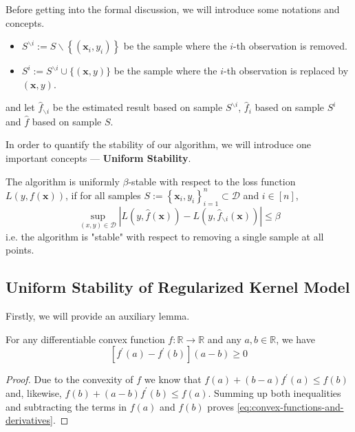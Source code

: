 \noindent Before getting into the formal discussion, we will introduce some notations and concepts.
\begin{itemize}
	\item $S^{\backslash i}:=S\backslash\left\{(\mathbf{x}_{i},y_{i})\right\}$ be the sample where the $i$-th observation is removed.
	\item $S^{i}:=S^{\backslash i}\cup\{(\mathbf{x},y)\}$ be the sample where the $i$-th observation is replaced by $(\mathbf{x},y)$.
\end{itemize}
and let $\hat{f}_{\backslash i}$ be the estimated result based on sample $S^{\backslash i}$, $\hat{f}_{i}$ based on sample $S^{i}$ and $\hat{f}$ based on sample $S$.

In order to quantify the stability of our algorithm, we will introduce one important concepts --- \textbf{Uniform Stability}.
\begin{definition}
	\label{def:uniform-stability}
	The algorithm is uniformly $\beta$-stable with respect to the loss function $L\left(y,f(\mathbf{x})\right)$, if for all samples $S:=\left\{\mathbf{x}_{i},y_{i}\right\}_{i=1}^{n}\subset\mathcal{D}$ and $i\in[n]$,
	\begin{equation}
		\sup_{(x,y)\in\mathcal{D}}\left|L\left(y,\hat{f}(\mathbf{x})\right)-L\left(y,\hat{f}_{\backslash i}(\mathbf{x})\right)\right|\leq\beta
	\end{equation}
	i.e. the algorithm is "stable" with respect to removing a single sample at all points.
\end{definition}

\subsection{Uniform Stability of Regularized Kernel Model}

Firstly, we will provide an auxiliary lemma.

\begin{lemma} \label{lem:convex-functions-and-derivatives}
	For any differentiable convex function $f:\mathbb{R}\rightarrow\mathbb{R}$ and any $a,b\in\mathbb{R}$, we have
	\begin{equation}
		\label{eq:convex-functions-and-derivatives}
		\left[f^{\prime}(a)-f^{\prime}(b)\right](a-b)\geq 0
	\end{equation}
\end{lemma}

\begin{proof}
	Due to the convexity of $f$ we know that $f(a)+(b-a) f^{\prime}(a) \leq f(b)$ and, likewise, $f(b)+(a-b) f^{\prime}(b) \leq f(a)$. Summing up both inequalities and subtracting the terms in $f(a)$ and $f(b)$ proves \eqref{eq:convex-functions-and-derivatives}.
\end{proof}

